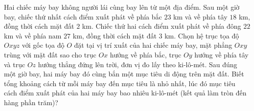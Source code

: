\begin{ex}%
	Hai chiếc máy bay không người lái cùng bay lên từ một địa điểm. Sau một giờ bay, chiếc thứ nhất cách điểm xuất phát về phía bắc $23$ km và về phía tây $18$ km, đồng thời cách mặt đất $2$ km. Chiếc thứ hai cách điểm xuất phát về phía đông $22$ km và về phía nam $27$ km, đồng thời cách mặt đất $3$ km. Chọn hệ trục tọa độ $Oxyz$ với gốc tọa độ $O$ đặt tại vị trí xuất của hai chiếc máy bay, mặt phẳng $Oxy$ trùng với mặt đất sao cho trục $Ox$ hướng về phía bắc, trục $Oy$ hướng về phía tây và trục $Oz$ hướng thẳng đứng lên trời, đơn vị đo lấy theo ki-lô-mét. Sau đúng một giờ bay, hai máy bay đó cùng bắn một mục tiêu di động trên mặt đất. Biết tổng khoảng cách từ mỗi máy bay đến mục tiêu là nhỏ nhất, lúc đó mục tiêu cách điểm xuất phát của hai máy bay bao nhiêu ki-lô-mét (kết quả làm tròn đến hàng phần trăm)?
	\par
\end{ex}
